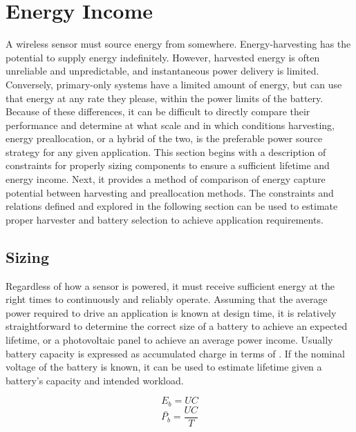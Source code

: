 \section{Energy Income}
\label{sec:intuition:energy_income}
A wireless sensor must source energy from somewhere. 
Energy-harvesting has the potential to supply energy indefinitely. However, harvested energy is often unreliable and unpredictable, and instantaneous power delivery is limited. 
Conversely, primary-only systems have a limited amount of energy, but can use that energy at any rate they please, within the power limits of the battery. 
Because of these differences, it can be difficult to directly compare their performance and determine at what scale and in which conditions harvesting, energy preallocation, or a hybrid of the two, is the preferable power source strategy for any given application.
This section begins with a description of constraints for properly sizing components to ensure a sufficient lifetime and energy income. 
Next, it provides a method of comparison of energy capture potential between harvesting and preallocation methods.
The constraints and relations defined and explored in the following section can be used to estimate proper harvester and battery selection to achieve application requirements.

\subsection{Sizing}
\label{sec:intuition:energy_income_sizing}
Regardless of how a sensor is powered, it must receive sufficient energy at the right times to continuously and reliably operate.
Assuming that the average power required to drive an application is known at design time, it is relatively straightforward to determine the correct size of a battery to achieve an expected lifetime, or a photovoltaic panel to achieve an average power income.
Usually battery capacity is expressed as accumulated charge in terms of \ssi{\milli\Ah}.
If the nominal voltage of the battery is known, it can be used to estimate lifetime given a battery's capacity and intended workload.

\begin{equation} \label{eqn:intuition:energy_battery_estimation}
   E_b = U C
\end{equation}
\begin{equation} \label{eqn:intuition:power_battery_estimation}
   \bar{P_b} = \frac{U C}{T} 
\end{equation}


